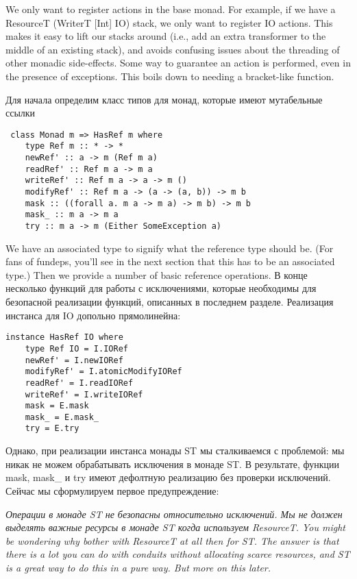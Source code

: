 We only want to register actions in the base monad. For example, if we have a
ResourceT (WriterT [Int] IO) stack, we only want to register
IO actions. This makes it easy to lift our stacks around (i.e., add an extra
transformer to the middle of an existing stack), and avoids confusing issues about the
threading
of other monadic side-effects.
Some way to guarantee an action is performed, even in the presence of exceptions. This
boils
down to needing a bracket-like function.

Для начала определим класс типов для монад, которые имеют мутабельные ссылки
\begin{lstlisting}
 class Monad m => HasRef m where
    type Ref m :: * -> *
    newRef' :: a -> m (Ref m a)
    readRef' :: Ref m a -> m a
    writeRef' :: Ref m a -> a -> m ()
    modifyRef' :: Ref m a -> (a -> (a, b)) -> m b
    mask :: ((forall a. m a -> m a) -> m b) -> m b
    mask_ :: m a -> m a
    try :: m a -> m (Either SomeException a)
\end{lstlisting}

We have an associated type to signify what the reference type should be. (For fans of
fundeps,
you'll see in the next section that this has to be an associated type.) Then we provide a
number of basic reference operations. В конце несколько функций для работы с
исключениями, которые необходимы для безопасной реализации функций, описанных в
последнем разделе. Реализация инстанса для IO допольно прямолинейна:
  
\begin{lstlisting}
instance HasRef IO where
    type Ref IO = I.IORef
    newRef' = I.newIORef
    modifyRef' = I.atomicModifyIORef
    readRef' = I.readIORef
    writeRef' = I.writeIORef
    mask = E.mask
    mask_ = E.mask_
    try = E.try 
\end{lstlisting}
Однако, при реализации инстанса монады ST мы сталкиваемся с проблемой: мы никак не можем
обрабатывать исключения в монаде ST. В результате, функции mask, mask\_ и try имеют
дефолтную реализацию без проверки исключений. Сейчас мы сформулируем первое
предупреждение:

\textit{Операции в монаде ST не безопасны относительно исключений. Мы не должен выделять
важные ресурсы в монаде ST когда используем ResourceT. You might be wondering why bother
with
ResourceT at all then for ST. The answer is that there is a
lot you can do with conduits without allocating scarce resources, and ST is a
great way to do this in a pure way. But more on this later. }

